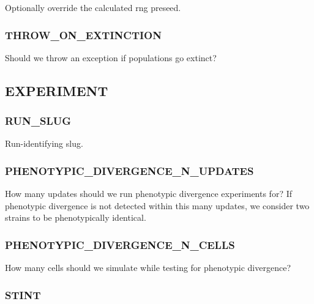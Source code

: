 
Optionally override the calculated rng preseed.

\subsubsection{THROW\_ON\_EXTINCTION}


Should we throw an exception if populations go extinct?


\subsection{EXPERIMENT}


\subsubsection{RUN\_SLUG}


Run-identifying slug.

\subsubsection{PHENOTYPIC\_DIVERGENCE\_N\_UPDATES}


How many updates should we run phenotypic divergence experiments for?
If phenotypic divergence is not detected within this many updates, we consider two strains to be phenotypically identical.

\subsubsection{PHENOTYPIC\_DIVERGENCE\_N\_CELLS}


How many cells should we simulate while testing for phenotypic divergence?

\subsubsection{STINT}


